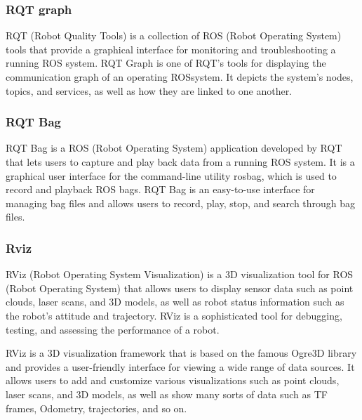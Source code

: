 \documentclass[11pt, a4paper, openany]{book}
\begin{document}
 \subsubsection{RQT graph}
 RQT (Robot Quality Tools) is a collection of ROS (Robot Operating System) tools that provide a graphical interface for monitoring and troubleshooting a running ROS system. RQT Graph is one of RQT's tools for displaying the communication graph of an operating
 ROSsystem. It depicts the system's nodes, topics, and services, as well as how they are linked to one another.
 \subsubsection{RQT Bag}
RQT Bag is a ROS (Robot Operating System) application developed by RQT that lets users to capture and play back data from a running ROS system. It is a graphical user interface for the command-line utility rosbag, which is used to record and playback ROS bags. RQT Bag is an easy-to-use interface for managing bag files and allows users to record, play, stop, and search through bag files.
\newline
 \subsubsection{Rviz}
RViz (Robot Operating System Visualization) is a 3D visualization tool for ROS (Robot Operating System) that allows users to display sensor data such as point clouds, laser scans, and 3D models, as well as robot status information such as the robot's attitude and trajectory. RViz is a sophisticated tool for debugging, testing, and assessing the performance of a robot.

RViz is a 3D visualization framework that is based on the famous Ogre3D library and provides a user-friendly interface for viewing a wide range of data sources. It allows users to add and customize various visualizations such as point clouds, laser scans, and 3D models, as well as show many sorts of data such as TF frames, Odometry, trajectories, and so on.
\end{document}
